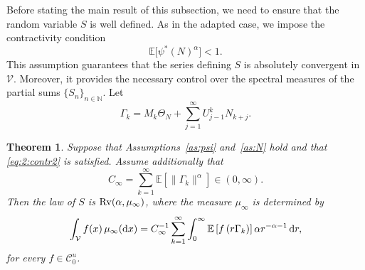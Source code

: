 \documentclass[preprint,12pt]{elsarticle}
\newtheorem{thm}{Theorem}[section]
\theoremstyle{definition}
\theoremstyle{remark}
\newcommand{\xbf}{{ x}}
\newcommand{\Mbf}{{ M}}
\newcommand{\Ubf}{{ U}}
\newcommand{\Nbf}{{ N}}
\newcommand{\Sbf}{{ S}}
\newcommand{\1}{{\mathbf 1}}
\numberwithin{equation}{section}
\newcommand{\Ebb}{\mathbb{E}}  %
\newcommand{\ud}{{\rm d}}
\newcommand{\Rvrm}{{\rm Rv}}
\newcommand{\Vcal}{\mathcal{V}}
\newcommand{\Ccal}{\mathcal{C}}
\begin{document}
	Before stating the main result of this subsection, we need to ensure that the random variable $\Sbf$ is well defined. 
	As in the adapted case, we impose the contractivity condition
	\begin{equation}\label{eq:2:contr2}
    		\Ebb\big[\psi^*(\Nbf)^\alpha\big] < 1.
	\end{equation}
	This assumption guarantees that the series defining $\Sbf$ is absolutely convergent in $\Vcal$. 
	Moreover, it provides the necessary control over the spectral measures of the partial sums 
	$\{\Sbf_n\}_{n\in\mathbb{N}}$.
    Let 
      \begin{equation*}\label{eq:4:gammak}
    \Gamma_k
    =
    \Mbf_k\Theta_\Nbf
    +
    \sum_{j=1}^{\infty}
    \Ubf_{j-1}^k\Nbf_{k+j}.
  \end{equation*}
\begin{thm}\label{thm:2:RCLM2}
  Suppose that Assumptions~\ref{as:psi} and~\ref{as:N} hold and that
  \eqref{eq:2:contr2} is satisfied. Assume additionally that
  \begin{equation*}
  C_\infty
  =
  \sum_{k=1}^\infty
  \Ebb\left[\|\Gamma_k\|^\alpha\right]\in (0,\infty).
\end{equation*}
  Then the law of $\Sbf$ is
  $\Rvrm(\alpha,\mu_\infty)$, where the measure $\mu_\infty$ is determined by
  \begin{equation*}
    \int_{\Vcal} f(\xbf)\,\mu_\infty(\ud\xbf)
    =
    C_\infty^{-1}
    \sum_{k=1}^\infty
    \int_0^\infty
    \Ebb\left[
      f\left(r\Gamma_k\right)
    \right]
    \alpha r^{-\alpha-1}\,\ud r,
  \end{equation*}
  for every $f\in\Ccal_0^u$.
\end{thm}
\end{document}

